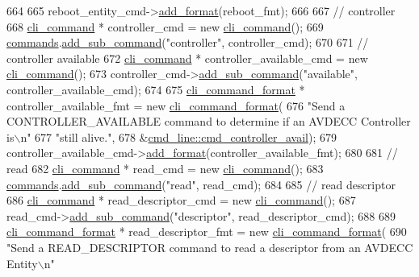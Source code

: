 \begin{DoxyCode}
664 
665     reboot\_entity\_cmd->\hyperlink{classcli__command_aa9ec38e761644d946f8db2b920e39921}{add\_format}(reboot\_fmt);
666 
667     \textcolor{comment}{// controller}
668     \hyperlink{classcli__command}{cli\_command} * controller\_cmd = \textcolor{keyword}{new} \hyperlink{classcli__command}{cli\_command}();
669     \hyperlink{classcmd__line_ae4fea670c2fdd2b60f7b5b6ad6fbaf1e}{commands}.\hyperlink{classcli__command_aa73a67e8ebb6facd4b40ced66279b226}{add\_sub\_command}(\textcolor{stringliteral}{"controller"}, controller\_cmd);
670 
671     \textcolor{comment}{// controller available}
672     \hyperlink{classcli__command}{cli\_command} * controller\_available\_cmd = \textcolor{keyword}{new} \hyperlink{classcli__command}{cli\_command}();
673     controller\_cmd->\hyperlink{classcli__command_aa73a67e8ebb6facd4b40ced66279b226}{add\_sub\_command}(\textcolor{stringliteral}{"available"}, controller\_available\_cmd);
674 
675     \hyperlink{classcli__command__format}{cli\_command\_format} * controller\_available\_fmt = \textcolor{keyword}{new} 
      \hyperlink{classcli__command__format}{cli\_command\_format}(
676         \textcolor{stringliteral}{"Send a CONTROLLER\_AVAILABLE command to determine if an AVDECC Controller is\(\backslash\)n"}
677         \textcolor{stringliteral}{"still alive."},
678         &\hyperlink{classcmd__line_a4ed4eea2b99a68cc53dcc9e503ac7844}{cmd\_line::cmd\_controller\_avail});
679     controller\_available\_cmd->\hyperlink{classcli__command_aa9ec38e761644d946f8db2b920e39921}{add\_format}(controller\_available\_fmt);
680 
681     \textcolor{comment}{// read}
682     \hyperlink{classcli__command}{cli\_command} * read\_cmd = \textcolor{keyword}{new} \hyperlink{classcli__command}{cli\_command}();
683     \hyperlink{classcmd__line_ae4fea670c2fdd2b60f7b5b6ad6fbaf1e}{commands}.\hyperlink{classcli__command_aa73a67e8ebb6facd4b40ced66279b226}{add\_sub\_command}(\textcolor{stringliteral}{"read"}, read\_cmd);
684 
685     \textcolor{comment}{// read descriptor}
686     \hyperlink{classcli__command}{cli\_command} * read\_descriptor\_cmd = \textcolor{keyword}{new} \hyperlink{classcli__command}{cli\_command}();
687     read\_cmd->\hyperlink{classcli__command_aa73a67e8ebb6facd4b40ced66279b226}{add\_sub\_command}(\textcolor{stringliteral}{"descriptor"}, read\_descriptor\_cmd);
688 
689     \hyperlink{classcli__command__format}{cli\_command\_format} * read\_descriptor\_fmt = \textcolor{keyword}{new} 
      \hyperlink{classcli__command__format}{cli\_command\_format}(
690         \textcolor{stringliteral}{"Send a READ\_DESCRIPTOR command to read a descriptor from an AVDECC Entity\(\backslash\)n"}

\end{DoxyCode}
